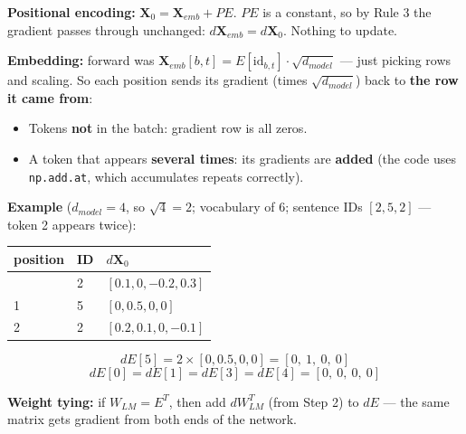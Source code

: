 \documentclass[11pt,a4paper,oneside]{report}
\providecommand{\tightlist}{\setlength{\itemsep}{0pt}\setlength{\parskip}{0pt}}
\begin{document}
\textbf{Positional encoding:} \(\mathbf{X}_0 = \mathbf{X}_{emb} + PE\). \(PE\) is a constant, so by Rule 3 the gradient passes through unchanged: \(d\mathbf{X}_{emb} = d\mathbf{X}_0\). Nothing to update.

\textbf{Embedding:} forward was \(\mathbf{X}_{emb}[b, t] = E[\text{id}_{b,t}] \cdot \sqrt{d_{model}}\) --- just picking rows and scaling. So each position sends its gradient (times \(\sqrt{d_{model}}\)) back to \textbf{the row it came from}:

\begin{center}\end{center}

\begin{itemize}
\tightlist
\item
  Tokens \textbf{not} in the batch: gradient row is all zeros.
\item
  A token that appears \textbf{several times}: its gradients are \textbf{added} (the code uses \texttt{np.\allowbreak{}add.\allowbreak{}at}, which accumulates repeats correctly).
\end{itemize}

\textbf{Example} (\(d_{model} = 4\), so \(\sqrt{4} = 2\); vocabulary of 6; sentence IDs \([2, 5, 2]\) --- token 2 appears twice):

{\def\LTcaptype{none} %
\begin{longtable}[]{@{}lll@{}}
\toprule\noalign{}
position & ID & \(d\mathbf{X}_0\) \\
\midrule\noalign{}
\endhead
\bottomrule\noalign{}
\endlastfoot
0 & 2 & \([0.1,\allowbreak 0,\allowbreak -0.2,\allowbreak 0.3]\) \\
1 & 5 & \([0,\allowbreak 0.5,\allowbreak 0,\allowbreak 0]\) \\
2 & 2 & \([0.2,\allowbreak 0.1,\allowbreak 0,\allowbreak -0.1]\) \\
\end{longtable}
}

\begin{center}\end{center}
\[dE[5] = 2 \times [0, 0.5, 0, 0] = [0,\ 1,\ 0,\ 0]\]
\[dE[0] = dE[1] = dE[3] = dE[4] = [0,\ 0,\ 0,\ 0]\]

\textbf{Weight tying:} if \(W_{LM} = E^T\), then add \(dW_{LM}^T\) (from Step 2) to \(dE\) --- the same matrix gets gradient from both ends of the network.
\end{document}
